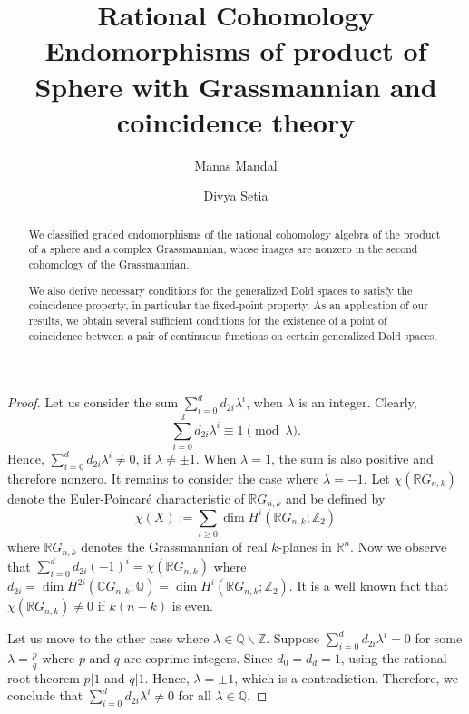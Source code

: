 \documentclass{amsart}
\title[Graded Endomorphisms of $H^*(\mathbb{S}^m \times \mathbb{C}G_{n,k};\mathbb Q)$]{Rational Cohomology Endomorphisms of product of Sphere with Grassmannian and coincidence theory}
\author[M. Mandal]{Manas Mandal}
\author[D. Setia]{Divya Setia}
\begin{document}
\begin{abstract}
We classified graded endomorphisms of the rational cohomology algebra of the product of a sphere and a complex Grassmannian, whose images are nonzero  in the second cohomology of the Grassmannian.

We also derive necessary conditions for the generalized Dold spaces to satisfy the coincidence property, in particular the fixed-point property. As an application of our results, we obtain several sufficient conditions for the existence of a point of coincidence between a pair of continuous functions on certain generalized Dold spaces. 
\end{abstract}
	
\maketitle

	\begin{proof}
		Let us consider the sum $\sum_{i=0}^d d_{2i}\lambda^i$, when $\lambda$ is an integer. 
		Clearly, $$\sum_{i=0}^d d_{2i}\lambda^i \equiv 1 \pmod{\lambda}.$$ %
		Hence, $\sum_{i=0}^d d_{2i}\lambda^i \neq 0$, if $\lambda \neq \pm 1$. When $\lambda = 1$, the sum is also positive and therefore nonzero. It remains to consider the case where $\lambda = -1$.
		Let $\chi(\mathbb{R}G_{n,k})$ denote the Euler-Poincar{\'e} characteristic of $\mathbb{R}G_{n,k}$ and be defined by $$\chi(X):=\sum_{i\ge0}\dim H^i(\mathbb{R}G_{n,k};\mathbb{Z}_2)$$ where $\mathbb{R}G_{n,k}$ denotes the Grassmannian of real $k$-planes in $\mathbb{R}^n$.
		Now we observe that 
		$\sum_{i=0}^d d_{2i}(-1)^i = \chi(\mathbb{R}G_{n,k})$ where $d_{2i} = \operatorname{dim} H^{2i}(\mathbb{C}G_{n,k}; \mathbb{Q}) = \dim H^{i}(\mathbb{R}G_{n,k}; \mathbb{Z}_2)$. 
		It is a well known fact that $\chi(\mathbb{R}G_{n,k}) \neq 0$ if $k(n-k)$ is even. 
		
		Let us move to the other case where $\lambda\in \mathbb{Q}\backslash \mathbb{Z}$. Suppose $\sum_{i=0}^{d} d_{2i}\lambda^i =0$ for some $\lambda = \frac{p}{q}$ where $p$ and $q$ are coprime integers. Since $d_0 =d_d =1$, using the rational root theorem $p|1$ and $q|1$. Hence, $\lambda = \pm 1$, which is a contradiction. Therefore, we conclude that $\sum_{i=0}^{d} d_{2i}\lambda^i \neq 0$ for all $\lambda\in \mathbb Q$. 

	\end{proof}
\end{document}
